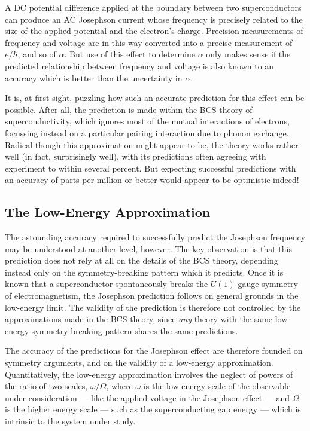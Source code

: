 \documentclass[12pt]{article}
\begin{document}
A DC potential difference applied at the boundary between 
two superconductors can produce an AC Josephson current whose
frequency is precisely related to the size of the applied
potential and the electron's charge. Precision measurements
of frequency and voltage are in this way converted into
a precise measurement of $e/\hbar$, and so of $\alpha$.
But use of this effect to determine $\alpha$ 
only makes sense if the predicted relationship between
frequency and voltage is also known to an
accuracy which is better than the uncertainty in $\alpha$. 

It is, at first sight, puzzling how such an accurate prediction
for this effect can be possible. After all, the prediction
is made within the BCS theory of superconductivity, \cite{BCS} which
ignores most of the mutual interactions of electrons, focussing
instead on a particular pairing interaction due to phonon 
exchange. Radical though this approximation might appear
to be, the theory works rather well (in fact, surprisingly
well), with its predictions often agreeing with experiment to 
within several percent. But expecting successful predictions with an
accuracy of parts per million or better would appear to be
optimistic indeed!

\subsection{The Low-Energy Approximation}

The astounding accuracy required to successfully predict the
Josephson frequency may be understood at another level, 
however. The key observation is that this prediction does
not rely at all on the details of the BCS theory, depending
instead only on the symmetry-breaking pattern which it
predicts. Once it is known that a superconductor 
spontaneously breaks the $U(1)$ gauge symmetry of electromagnetism,
the Josephson prediction follows on general grounds in the
low-energy limit.\cite{WeinbergSC} The validity of the prediction is therefore
not controlled by the approximations made in the BCS theory,
since {\it any} theory with the same low-energy symmetry-breaking
pattern shares the same predictions. 

The accuracy of the predictions for the Josephson effect
are therefore founded on symmetry arguments, and on
the validity of a low-energy approximation. Quantitatively,
the low-energy approximation involves the neglect of powers of the
ratio of two scales, $\omega/\Omega$, where $\omega$ is
the low energy scale of the observable under 
consideration --- like the applied voltage in the 
Josephson effect --- and $\Omega$ is the higher energy 
scale --- such as the superconducting gap 
energy --- which is intrinsic to the system under study.
\end{document}
